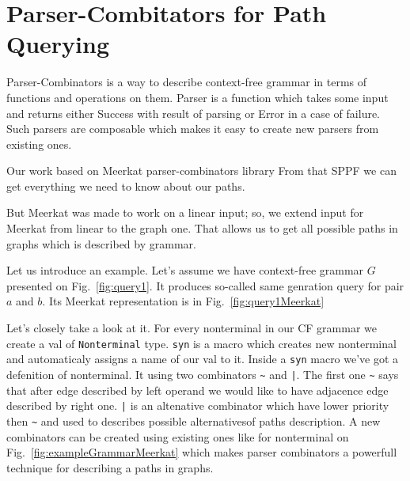\section{Parser-Combitators for Path Querying}

Parser-Combinators is a way to describe context-free grammar in terms of functions and operations on them. Parser is a function which takes some input and returns either Success with result of parsing or Error in a case of failure. Such parsers are composable which makes it easy to create new parsers from existing ones.

Our work based on Meerkat parser-combinators library  From that SPPF we can get everything we need to know about our paths.

But Meerkat was made to work on a linear input; so, we extend input for Meerkat from linear to the graph one.
That allows us to get all possible paths in graphs which is described by grammar.

Let us introduce an example. Let's assume we have context-free grammar $G$ presented on Fig.~\ref{fig:query1}.
It produces so-called same genration query for pair $a$ and $b$. Its Meerkat representation is in Fig.~\ref{fig:query1Meerkat}



Let's closely take a look at it. For every nonterminal in our CF grammar we create a val of  \lstinline{Nonterminal} type. \lstinline{syn} is a macro which creates new nonterminal and automaticaly assigns a name of our val to it. Inside a \lstinline{syn} macro we've got a defenition of nonterminal. It using two combinators \lstinline{~} and \lstinline{|}. The first one \lstinline{~} says that after edge described by left operand we would like to have adjacence edge described by right one. \lstinline{|} is an altenative combinator which have lower priority then \lstinline{~} and used to describes possible alternativesof paths description. A new combinators can be created using existing ones like for nonterminal on Fig.~\ref{fig:exampleGrammarMeerkat} which makes parser combinators a powerfull technique for describing a paths in graphs.

